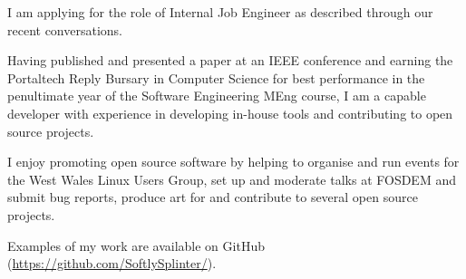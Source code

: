 \documentclass[10pt,stdletter,dateno,sigleft]{newlfm} %
\begin{document}
\begin{newlfm}




I am applying for the role of Internal Job Engineer as described through our recent conversations.


Having published and presented a paper at an IEEE conference and earning the
Portaltech Reply Bursary in Computer Science for best performance in the
penultimate year of the Software Engineering MEng course, I am a capable
developer with experience in developing in-house tools and contributing to
open source projects.

I enjoy promoting open source software by helping to organise and run events
for the West Wales Linux Users Group, set up and moderate talks at FOSDEM and
submit bug reports, produce art for and contribute to several open source 
projects.

Examples of my work are available on GitHub 
(\url{https://github.com/SoftlySplinter/}).


\end{newlfm}
\end{document}
